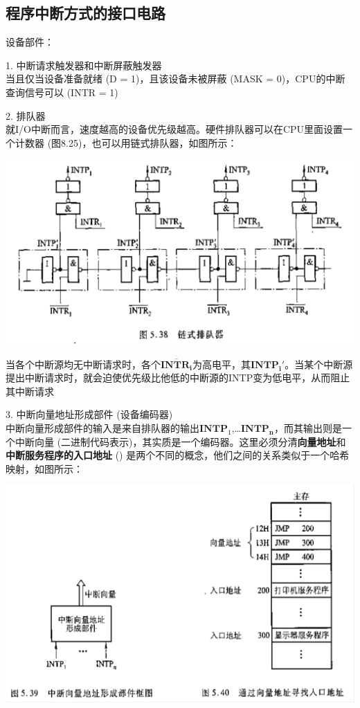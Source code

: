 \documentclass[]{report}
\begin{document}
			\subsection{程序中断方式的接口电路}
				设备部件：\par
				1. 中断请求触发器和中断屏蔽触发器\\
					当且仅当设备准备就绪 (D = 1)，且该设备未被屏蔽 (MASK = 0)，CPU的中断查询信号可以 (INTR = 1)\par
				2. 排队器\\
					就I/O中断而言，速度越高的设备优先级越高。硬件排队器可以在CPU里面设置一个计数器 (图8.25)，也可以用链式排队器，如图所示：\par
					\includegraphics[scale = 0.25]{../pictures/linked_queue_in_program_break.png}\par
					当各个中断源均无中断请求时，各个$\overline{\mathbf{INTR_i}}$为高电平，其$\mathbf{INTP_i}'$。当某个中断源提出中断请求时，就会迫使优先级比他低的中断源的INTP变为低电平，从而阻止其中断请求\par
				3. 中断向量地址形成部件 (设备编码器)\\
					中断向量形成部件的输入是来自排队器的输出$\mathbf{INTP}_1$,\dots$\mathbf{INTP_n}$，而其输出则是一个中断向量 (二进制代码表示)，其实质是一个编码器。这里必须分清\textbf{向量地址}和\textbf{中断服务程序的入口地址} ({}) 是两个不同的概念，他们之间的关系类似于一个哈希映射，如图所示：\par
					\includegraphics[scale = 0.23]{../pictures/Device_Number_hash.png}\par
\end{document}

